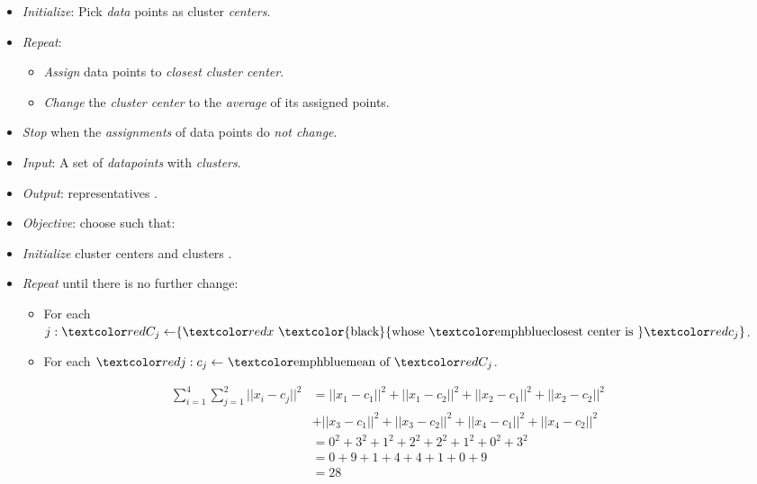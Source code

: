 \documentclass[
	number={6},
	title={Clustering}
]{cs584notes}
\begin{document}
\begin{itemize}
	\item \emph{Initialize}: Pick  \emph{data} points as cluster \emph{centers}.
	\item \emph{Repeat}:
	\begin{itemize}
		\item \emph{Assign} data points to \emph{closest cluster center}.
		\item \emph{Change} the \emph{cluster center} to the \emph{average} of its assigned points.
	\end{itemize}
	\item \emph{Stop} when the \emph{assignments} of data points do \emph{not change}.
	\item \emph{Input}: A set of  \emph{datapoints}  with  \emph{clusters}.
	\item \emph{Output}:  representatives .
	\item \emph{Objective}: choose  such that:
	\item \emph{Initialize} cluster centers  and clusters .
	\item \emph{Repeat} until there is no further change:
	\begin{itemize}
		\item For each $j: \data{C_{j} \gets} \{ \data{x} \mbox{ \textcolor{black}{whose \emph{closest center} is }} \data{c_{j}} \}$.
		\item For each $\data{ j: c_{j} \gets }\mbox{ \emph{mean} of } \data{C_{j}}$.
	\end{itemize}
\end{itemize}

\begin{equation*}
\begin{aligned}
	\sum_{i=1}^{4}\sum_{j=1}^{2} ||x_{i} - c_{j}||^{2} &= ||x_{1} - c_{1}||^{2} + ||x_{1} - c_{2}||^{2} + ||x_{2} - c_{1}||^{2} + ||x_{2} - c_{2}||^{2} \\&+ ||x_{3} - c_{1}||^{2} + ||x_{3} - c_{2}||^{2} + ||x_{4} - c_{1}||^{2} + ||x_{4} - c_{2}||^{2}\\
	&= 0^{2} + 3^{2} + 1^{2} + 2^{2} + 2^{2} + 1^{2} + 0^{2} + 3^{2}\\
	&= 0 + 9 + 1 + 4 + 4 + 1 + 0 + 9\\
	&= 28
\end{aligned}
\end{equation*}
\end{document}
